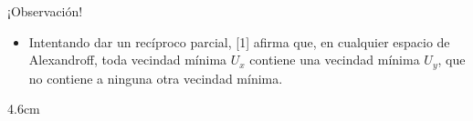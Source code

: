 \begin{frame}{¡Observación!}
   \begin{itemize}
      \item Intentando dar un recíproco parcial, [1] afirma que, \alert{en cualquier espacio de Alexandroff}, toda vecindad mínima $U_x$ contiene una vecindad mínima $U_y$, que no contiene a ninguna otra vecindad mínima.
   \end{itemize}
   \vspace{0.1cm}
   \begin{overlayarea}{\textwidth}{4.6cm}
   \end{overlayarea}
\end{frame}

